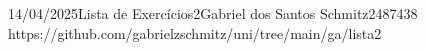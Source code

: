 \documentclass{article}
\begin{document}
{14/04/2025}{Lista de Exercícios}{2}{Gabriel dos Santos Schmitz}{2487438}
{https://github.com/gabrielzschmitz/uni/tree/main/ga/lista2}




\newpage
\printbibliography\
\end{document}
